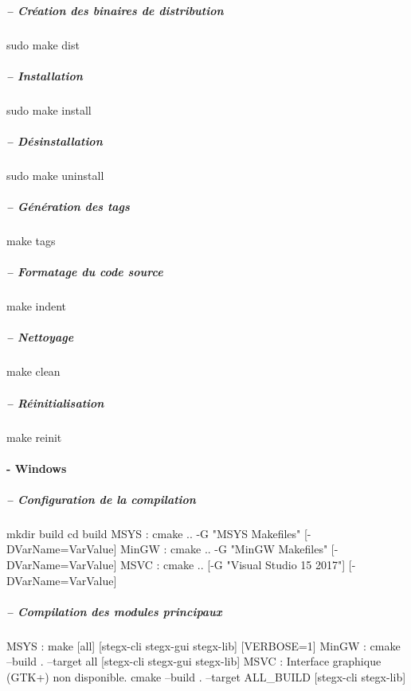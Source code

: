 \subparagraph*{-- Création des binaires de distribution}

\begin{DoxyVerb}sudo make dist
\end{DoxyVerb}


\subparagraph*{-- Installation}

\begin{DoxyVerb}sudo make install
\end{DoxyVerb}


\subparagraph*{-- Désinstallation}

\begin{DoxyVerb}sudo make uninstall
\end{DoxyVerb}


\subparagraph*{-- Génération des tags}

\begin{DoxyVerb}make tags
\end{DoxyVerb}


\subparagraph*{-- Formatage du code source}

\begin{DoxyVerb}make indent
\end{DoxyVerb}


\subparagraph*{-- Nettoyage}

\begin{DoxyVerb}make clean
\end{DoxyVerb}


\subparagraph*{-- Réinitialisation}

\begin{DoxyVerb}make reinit
\end{DoxyVerb}


\paragraph*{-\/ Windows}

\subparagraph*{-- Configuration de la compilation}

\begin{DoxyVerb}mkdir build
cd build
MSYS :
    cmake .. -G "MSYS Makefiles" [-DVarName=VarValue]
MinGW :
    cmake .. -G "MinGW Makefiles" [-DVarName=VarValue]
MSVC :
    cmake .. [-G "Visual Studio 15 2017"] [-DVarName=VarValue]
\end{DoxyVerb}


\subparagraph*{-- Compilation des modules principaux}

\begin{DoxyVerb}MSYS :
    make [all] [stegx-cli stegx-gui stegx-lib] [VERBOSE=1]
MinGW :
    cmake --build . --target all [stegx-cli stegx-gui stegx-lib]
MSVC : Interface graphique (GTK+) non disponible.
    cmake --build . --target ALL_BUILD [stegx-cli stegx-lib]
\end{DoxyVerb}


